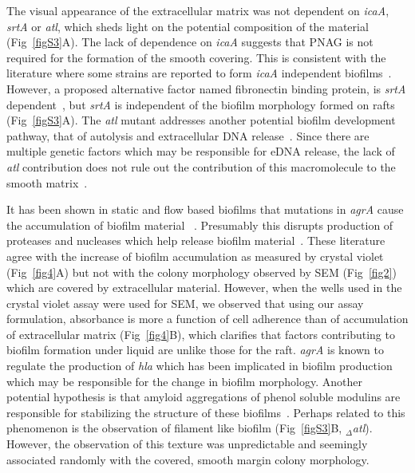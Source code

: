 \documentclass[10pt,letterpaper]{article}
\begin{document}
The visual appearance of the extracellular matrix was not dependent on \textit{icaA}, \textit{srtA} or \textit{atl}, which sheds light on the potential composition of the material (Fig~\ref{figS3}A).
The lack of dependence on \textit{icaA} suggests that PNAG is not required for the formation of the smooth covering.
This is consistent with the literature where some strains are reported to form \textit{icaA} independent biofilms~\cite{fitzpatrick_evidence_2005}.
However, a proposed alternative factor named fibronectin binding protein, is \textit{srtA} dependent~\cite{oneill_novel_2008}, but \textit{srtA} is independent of the biofilm morphology formed on rafts (Fig~\ref{figS3}A).
The \textit{atl} mutant addresses another potential biofilm development pathway, that of autolysis and extracellular DNA release~\cite{bose_contribution_2012}.
Since there are multiple genetic factors which may be responsible for eDNA release, the lack of \textit{atl} contribution does not rule out the contribution of this macromolecule to the smooth matrix~\cite{ranjit_staphylococcus_2011}.

It has been shown in static and flow based biofilms that mutations in \textit{agrA} cause the accumulation of biofilm material ~\cite{periasamy_how_2012}.
Presumably this disrupts production of proteases and nucleases which help release biofilm material~\cite{boles_agr-mediated_2008, kiedrowski_nuclease_2011}.
These literature agree with the increase of biofilm accumulation as measured by crystal violet (Fig~\ref{fig4}A) but not with the colony morphology observed by SEM (Fig~\ref{fig2}) which are covered by extracellular material.
However, when the wells used in the crystal violet assay were used for SEM, we observed that using our assay formulation, absorbance is more a function of cell adherence than of accumulation of extracellular matrix (Fig~\ref{fig4}B), which clarifies that factors contributing to biofilm formation under liquid are unlike those for the raft.
\textit{agrA} is known to regulate the production of \textit{hla} which has been implicated in biofilm production~\cite{caiazza_alpha-toxin_2003} which may be responsible for the change in biofilm morphology.
Another potential hypothesis is that amyloid aggregations of phenol soluble modulins are responsible for stabilizing the structure of these biofilms~\cite{schwartz_functional_2012}.
Perhaps related to this phenomenon is the observation of filament like biofilm (Fig~\ref{figS3}B, $_\Delta$\textit{atl}).
However, the observation of this texture was unpredictable and seemingly associated randomly with the covered, smooth margin colony morphology.
\end{document}
